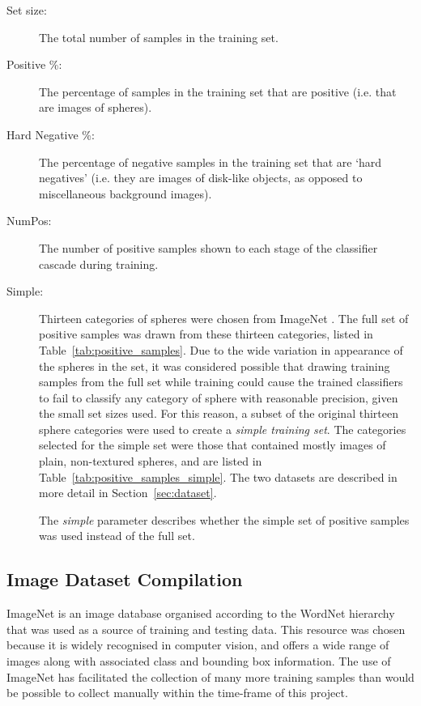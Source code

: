 \documentclass{llncs}
\newcommand{\scarequotes}[1]{`#1'}
\newcommand{\newterm}[1]{{\textit{#1}}}
\begin{document}
{		\begin{description}
			\item[Set size:] The total number of samples in the training set.
			\item[Positive \%:] The percentage of samples in the training set that are positive (i.e. that are images of spheres).
			\item[Hard Negative \%:] The percentage of negative samples in the training set that are \scarequotes{hard negatives} (i.e. they are images of disk-like objects, as opposed to miscellaneous background images).
			\item[NumPos:] The number of positive samples shown to each stage of the classifier cascade during training.
			\item[Simple:] 
				Thirteen categories of spheres were chosen from ImageNet \citep{imagenet_cvpr09}.
				The full set of positive samples was drawn from these thirteen categories, listed in Table~\ref{tab:positive_samples}.
				Due to the wide variation in appearance of the spheres in the set, it was considered possible that drawing training samples from the full set while training could cause the trained classifiers to fail to classify any category of sphere with reasonable precision, given the small set sizes used.
				For this reason, a subset of the original thirteen sphere categories were used to create a \newterm{simple training set}.
				The categories selected for the simple set were those that contained mostly images of plain, non-textured spheres, and are listed in Table~\ref{tab:positive_samples_simple}. The two datasets are described in more detail in Section~\ref{sec:dataset}.

				The \newterm{simple} parameter describes whether the simple set of positive samples was used instead of the full set.
		\end{description}

		\subsection{Image Dataset Compilation} {
		\label{sec:dataset}

			ImageNet \citep{imagenet_cvpr09} is an image database organised according to the WordNet hierarchy \citep{fellbaum1998wordnet} that was used as a source of training and testing data. This resource was chosen because it is widely recognised in computer vision, and offers a wide range of images along with associated class and bounding box information. The use of ImageNet has facilitated the collection of many more training samples than would be possible to collect manually within the time-frame of this project.

}}
\end{document}
